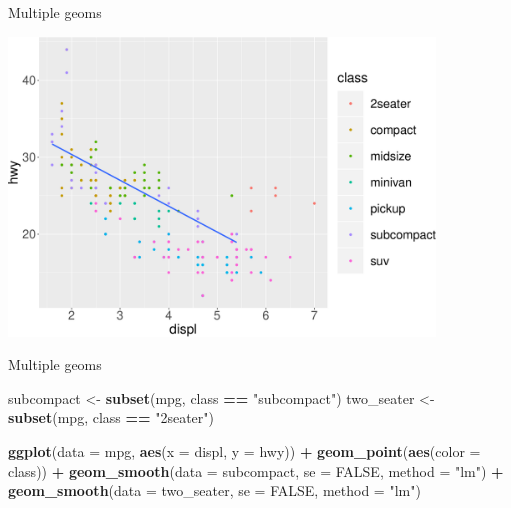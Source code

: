\documentclass[ignorenonframetext,]{beamer}
\newenvironment{Shaded}{\begin{snugshade}}{\end{snugshade}}
\newcommand{\DataTypeTok}[1]{\textcolor[rgb]{0.13,0.29,0.53}{#1}}
\newcommand{\KeywordTok}[1]{\textcolor[rgb]{0.13,0.29,0.53}{\textbf{#1}}}
\newcommand{\NormalTok}[1]{#1}
\newcommand{\OperatorTok}[1]{\textcolor[rgb]{0.81,0.36,0.00}{\textbf{#1}}}
\newcommand{\OtherTok}[1]{\textcolor[rgb]{0.56,0.35,0.01}{#1}}
\newcommand{\StringTok}[1]{\textcolor[rgb]{0.31,0.60,0.02}{#1}}
\begin{document}
\begin{frame}{Multiple geoms}
\protect\hypertarget{multiple-geoms-28}{}

\begin{center}\includegraphics[height=300px]{data-visualization_files/figure-beamer/unnamed-chunk-105-1} \end{center}

\end{frame}

\begin{frame}[fragile]{Multiple geoms}
\protect\hypertarget{multiple-geoms-29}{}

\begin{Shaded}
\begin{Highlighting}[]
\NormalTok{subcompact <-}\StringTok{ }\KeywordTok{subset}\NormalTok{(mpg, class }\OperatorTok{==}\StringTok{ "subcompact"}\NormalTok{)}
\NormalTok{two_seater <-}\StringTok{ }\KeywordTok{subset}\NormalTok{(mpg, class }\OperatorTok{==}\StringTok{ "2seater"}\NormalTok{)}

\KeywordTok{ggplot}\NormalTok{(}\DataTypeTok{data =}\NormalTok{ mpg, }\KeywordTok{aes}\NormalTok{(}\DataTypeTok{x =}\NormalTok{ displ, }\DataTypeTok{y =}\NormalTok{ hwy)) }\OperatorTok{+}
\StringTok{  }\KeywordTok{geom_point}\NormalTok{(}\KeywordTok{aes}\NormalTok{(}\DataTypeTok{color =}\NormalTok{ class)) }\OperatorTok{+}
\StringTok{  }\KeywordTok{geom_smooth}\NormalTok{(}\DataTypeTok{data =}\NormalTok{ subcompact, }\DataTypeTok{se =} \OtherTok{FALSE}\NormalTok{,}
              \DataTypeTok{method =} \StringTok{"lm"}\NormalTok{) }\OperatorTok{+}
\StringTok{  }\KeywordTok{geom_smooth}\NormalTok{(}\DataTypeTok{data =}\NormalTok{ two_seater, }\DataTypeTok{se =} \OtherTok{FALSE}\NormalTok{,}
              \DataTypeTok{method =} \StringTok{"lm"}\NormalTok{)}
\end{Highlighting}
\end{Shaded}

\end{frame}
\end{document}
